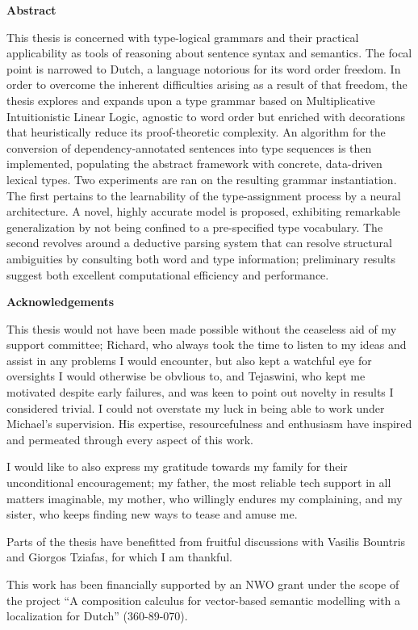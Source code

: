 \documentclass{book}
\newlength{\arrow}
\newenvironment{abstract}%
    {\cleardoublepage\thispagestyle{empty}\null\vfill\begin{center}%
    \bfseries\abstractname\end{center}}%
    {\vfill\null}
\newcommand\abstractname{Abstract}
\newenvironment{acknowledgements}%
    {\cleardoublepage\thispagestyle{empty}\null\vfill\begin{center}%
    \bfseries Acknowledgements\end{center}}%
    {\vfill\null}
\begin{document}
\begin{abstract}
This thesis is concerned with type-logical grammars and their practical applicability as tools of reasoning about sentence syntax and semantics.
The focal point is narrowed to Dutch, a language notorious for its word order freedom.
In order to overcome the inherent difficulties arising as a result of that freedom, the thesis explores and expands upon a type grammar based on Multiplicative Intuitionistic Linear Logic, agnostic to word order but enriched with decorations that heuristically reduce its proof-theoretic complexity.
An algorithm for the conversion of dependency-annotated sentences into type sequences is then implemented, populating the abstract framework with concrete, data-driven lexical types.
Two experiments are ran on the resulting grammar instantiation.
The first pertains to the learnability of the type-assignment process by a neural architecture. 
A novel, highly accurate model is proposed, exhibiting remarkable generalization by not being confined to a pre-specified type vocabulary.
The second revolves around a deductive parsing system that can resolve structural ambiguities by consulting both word and type information; preliminary results suggest both excellent computational efficiency and performance.
\end{abstract}

\begin{acknowledgements}
This thesis would not have been made possible without the ceaseless aid of my support committee;
Richard, who always took the time to listen to my ideas and assist in any problems I would encounter, but also kept a watchful eye for oversights I would otherwise be obvlious to, and
Tejaswini, who kept me motivated despite early failures, and was keen to point out novelty in results I considered trivial.
I could not overstate my luck in being able to work under Michael's supervision.
His expertise, resourcefulness and enthusiasm have inspired and permeated through every aspect of this work.

\vspace{1.6em}
I would like to also express my gratitude towards my family for their unconditional encouragement; my father, the most reliable tech support in all matters imaginable, my mother, who willingly endures my complaining, and my sister, who keeps finding new ways to tease and amuse me.

\vspace{1.6em}
Parts of the thesis have benefitted from fruitful discussions with Vasilis Bountris and Giorgos Tziafas, for which I am thankful.

\vspace{1.6em}
This work has been financially supported by an NWO grant under the scope of the project ``A composition calculus for vector-based semantic modelling with a localization for Dutch'' (360-89-070).
\end{acknowledgements}


\tableofcontents
\listoftables
\listoffigures
\listofalgorithms















\end{document}
